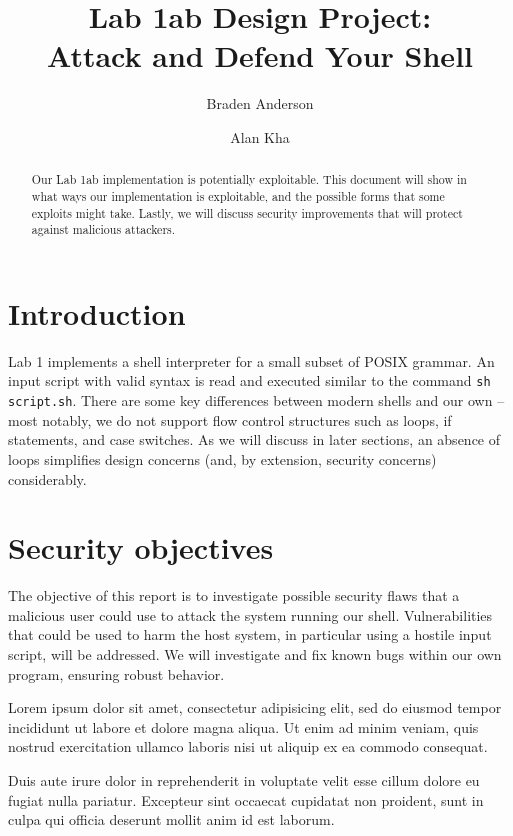 \documentclass[12pt]{article}
\begin{document}
\lstset{language=C}

\title{Lab 1ab Design Project:\\ Attack and Defend Your Shell}
\author[1]{Braden Anderson}
\author[2]{Alan Kha}

\maketitle

\begin{abstract}
Our Lab 1ab implementation is potentially exploitable. This document will show in what ways our implementation is exploitable, and the possible forms that some exploits might take. Lastly, we will discuss security improvements that will protect against malicious attackers.
\end{abstract}

\section{Introduction}
Lab 1 implements a shell interpreter for a small subset of POSIX grammar. An input script with valid syntax is read and executed similar to the command \texttt{sh script.sh}. There are some key differences between modern shells and our own -- most notably, we do not support flow control structures such as loops, if statements, and case switches. As we will discuss in later sections, an absence of loops simplifies design concerns (and, by extension, security concerns) considerably.

\section{Security objectives}
The objective of this report is to investigate possible security flaws that a malicious user could use to attack the system running our shell. Vulnerabilities that could be used to harm the host system, in particular using a hostile input script, will be addressed. We will investigate and fix known bugs within our own program, ensuring robust behavior.


Lorem ipsum dolor sit amet, consectetur adipisicing elit, sed do eiusmod tempor incididunt ut labore et dolore magna aliqua. Ut enim ad minim veniam, quis nostrud exercitation ullamco laboris nisi ut aliquip ex ea commodo consequat. 

Duis aute irure dolor in reprehenderit in voluptate velit esse cillum dolore eu fugiat nulla pariatur. Excepteur sint occaecat cupidatat non proident, sunt in culpa qui officia deserunt mollit anim id est laborum.
\end{document}
